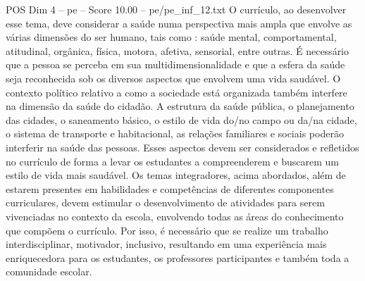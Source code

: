 \begin{textsample}{POS Dim 4 – pe – Score 10.00 – pe/pe\_inf\_12.txt}
O currículo, ao desenvolver esse tema, deve considerar a saúde numa perspectiva mais ampla que envolve as várias dimensões do ser humano, tais como : saúde mental, comportamental, atitudinal, orgânica, física, motora, afetiva, sensorial, entre outras.
É necessário que a pessoa se perceba em sua multidimensionalidade e que a esfera da saúde seja reconhecida sob os diversos aspectos que envolvem uma vida saudável.
O contexto político relativo a como a sociedade está organizada também interfere na dimensão da saúde do cidadão.
A estrutura da saúde pública, o planejamento das cidades, o saneamento básico, o estilo de vida do/no campo ou da/na cidade, o sistema de transporte e habitacional, as relações familiares e sociais poderão interferir na saúde das pessoas.
Esses aspectos devem ser considerados e refletidos no currículo de forma a levar os estudantes a compreenderem e buscarem um estilo de vida mais saudável.
Os temas integradores, acima abordados, além de estarem presentes em habilidades e competências de diferentes componentes curriculares, devem estimular o desenvolvimento de atividades para serem vivenciadas no contexto da escola, envolvendo todas as áreas do conhecimento que compõem o currículo.
Por isso, é necessário que se realize um trabalho interdisciplinar, motivador, inclusivo, resultando em uma experiência mais enriquecedora para os estudantes, os professores participantes e também toda a comunidade escolar.

\end{textsample}
